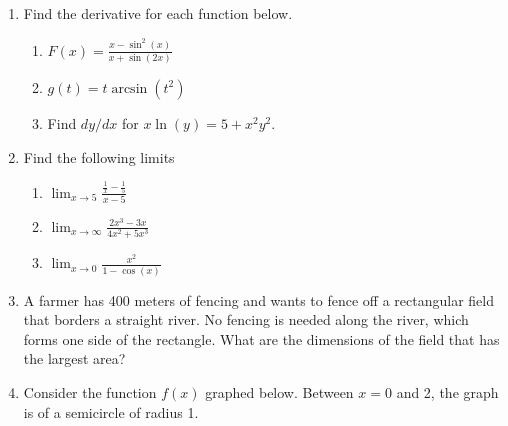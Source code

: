 \documentclass[11pt,fleqn]{article}
\def\ds{\displaystyle}
\begin{document}
\begin{enumerate}
\vfill
\item Find the derivative for each function below.
	\begin{enumerate}
	\item $\displaystyle{F(x)=\frac{x-\sin^2(x)}{x+\sin(2x)}}$
	\vfill
	\item $\displaystyle g(t)=t \arcsin(t^2)$
	\vfill
	\item Find $dy/dx$ for $\displaystyle x\ln(y)=5+x^2y^2.$ 
	\vfill
	\end{enumerate}
\newpage
\item Find the following limits
	\begin{enumerate}
	\item $\ds \lim_{x \to 5} \frac{\frac{1}{x}-\frac{1}{5}}{x-5}$
	\vfill
	\item $\ds \lim_{x \to \infty} \frac{2x^3-3x}{4x^2+5x^3}$
	\vfill
	\item $\ds \lim_{x \to 0} \frac{x^2}{1-\cos(x)}$
	\vfill
	\end{enumerate}
\item A farmer has 400 meters of fencing and wants to fence off a rectangular field that borders a straight river.
No fencing is needed along the river, which forms one side of the rectangle. What are the dimensions of
the field that has the largest area?
\vspace{3in}
\newpage
\item Consider the function $f(x)$ graphed below. Between $x=0$ and 2, the graph is of a semicircle of radius 1.

\begin{center}
\end{center}


\end{enumerate}
\end{document}
